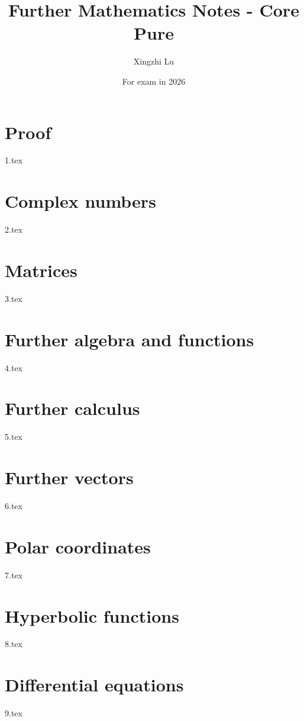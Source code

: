 \documentclass[A4paper]{article}
\title{Further Mathematics Notes - Core Pure}
\author{Xingzhi Lu}
\date{For exam in 2026}
\begin{document}
	\maketitle
	\tableofcontents
	\pagebreak
	\section{Proof} %
	{1.tex} \pagebreak
	
	\section{Complex numbers} %
	{2.tex} \pagebreak
	
	\section{Matrices} %
	{3.tex} \pagebreak
	
	\section{Further algebra and functions} %
	{4.tex} \pagebreak
	
	\section{Further calculus}
	{5.tex} \pagebreak
	
	\section{Further vectors} %
	{6.tex} \pagebreak
	
	\section{Polar coordinates} %
	{7.tex} \pagebreak
	
	\section{Hyperbolic functions}
	{8.tex} \pagebreak
	
	\section{Differential equations}
	{9.tex}

	
	
	\pagebreak
	
	
\end{document}
